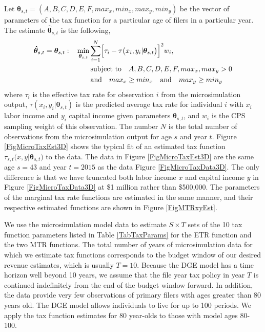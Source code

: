 \documentclass[letterpaper,12pt]{article}
\theoremstyle{definition}
\begin{document}
\begin{spacing}{1.5}
    Let $\bm{\theta}_{s,t}=(A,B,C,D,E,F,max_x,min_x,max_y,min_y)$ be the vector of parameters of the tax function for a particular age of filers in a particular year. The estimate $\bm{\hat{\theta}}_{s,t}$ is the following,
    \begin{equation}\label{EqThetaWSSQ}
      \begin{split}
        \bm{\hat{\theta}}_{s,t} = \bm{\theta}_{s,t}:\quad &\min_{\bm{\theta}_{s,t}}\sum_{i=1}^{N} \Bigl[\tau_{i}-\tau\bigl(x_i,y_i|\bm{\theta}_{s,t}\bigr)\Bigr]^{2} w_i, \\
        &\qquad\text{subject to}\quad A, B, C, D, E, F, max_x, max_y > 0 \\
        &\qquad\text{and}\quad max_{x}\geq min_x \quad\text{and}\quad max_{y}\geq min_y
      \end{split}
    \end{equation}
    where $\tau_{i}$ is the effective tax rate for observation $i$ from the microsimulation output, $\tau(x_i,y_i|\bm{\theta}_{s,t})$ is the predicted average tax rate for individual $i$ with $x_{i}$ labor income and $y_{i}$ capital income given parameters $\bm{\theta}_{s,t}$, and $w_{i}$ is the CPS sampling weight of this observation. The number $N$ is the total number of observations from the microsimulation output for age $s$ and year $t$. Figure \ref{FigMicroTaxEst3D} shows the typical fit of an estimated tax function $\tau_{s,t}\bigl(x,y|\bm{\theta}_{s,t}\bigr)$ to the data. The data in Figure \ref{FigMicroTaxEst3D} are the same age $s=43$ and year $t=2015$ as the data Figure \ref{FigMicroTaxData3D}. The only difference is that we have truncated both labor income $x$ and capital income $y$ in Figure \ref{FigMicroTaxData3D} at \$1 million rather than \$500,000. The parameters of the marginal tax rate functions are estimated in the same manner, and their respective estimated functions are shown in Figure \ref{FigMTRxyEst}.

    We use the microsimulation model data to estimate $S\times T$ sets of the 10 tax function parameters listed in Table \ref{TabTaxParams} for the ETR function and the two MTR functions. The total number of years of microsimulation data for which we estimate tax functions corresponds to the budget window of our desired revenue estimates, which is usually $T=10$. Because the DGE model has a time horizon well beyond 10 years, we assume that the file year tax policy in year $T$ is continued indefinitely from the end of the budget window forward. In addition, the data provide very few observations of primary filers with ages greater than 80 years old. The DGE model allows individuals to live for up to 100 periods.  We apply the tax function estimates for 80 year-olds to those with model ages 80-100.



\end{spacing}
\end{document}

